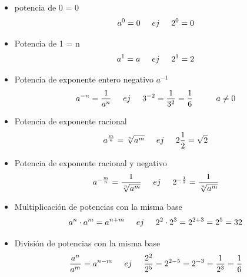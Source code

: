 \documentclass{article}
\begin{document}
	

\begin{itemize}
	
	
	\item{potencia de 0 = 0}
	\begin{equation*}
		a^0 = 0  \hspace{0.5cm}ej\hspace{0.5cm} 2^0 = 0
	\end{equation*}
	\item{Potencia de 1 = n}
	\begin{equation*}
		a^1 = a \hspace{0.5cm}ej\hspace{0.5cm} 2^1 = 2
	\end{equation*}
	\item{Potencia de exponente entero negativo $a^{-1}$}
	\begin{equation*}
		a^{-n} = \frac{1}{a^n} \hspace{0.5cm}ej\hspace{0.5cm} 3^{-2} = \frac{1}{3^2} = \frac{1}{6} \hspace{1cm} a \neq 0
	\end{equation*}
	\item{Potencia de exponente racional}
	\begin{equation*}
		a^{\frac{m}{n}} = \sqrt[n]{a^m} \hspace{0.5cm}ej\hspace{0.5cm} 2{\frac{1}{2}} = \sqrt{2} 
	\end{equation*}
	
	\item{Potencia de exponente racional y negativo}
	\begin{equation*}
		a^{-\frac{m}{n}} = \frac{1}{\sqrt[n]{a^m}} \hspace{0.5cm}ej\hspace{0.5cm} 2^{-\frac{1}{2}} = \frac{1}{\sqrt[n]{a^m}}
	\end{equation*}
	
	\item{Multiplicación de potencias con la misma base}
	\begin{equation*}
		a^n\cdot a^m = a^{n+m} \hspace{0.5cm}ej\hspace{0.5cm} 2^2 \cdot 2^3 = 2^{2+3} = 2^5 = 32
	\end{equation*}
	
	
	\item{División de potencias con la misma base}
	\begin{equation*}
		\frac{a^n}{a^m} = a^{n-m} \hspace{0.5cm}ej\hspace{0.5cm} \frac{2^2}{2^5} = 2^{2-5} = 2^{-3} = \frac{1}{2^3} = \frac{1}{6} 
	\end{equation*}
	

\end{itemize}
\end{document}
